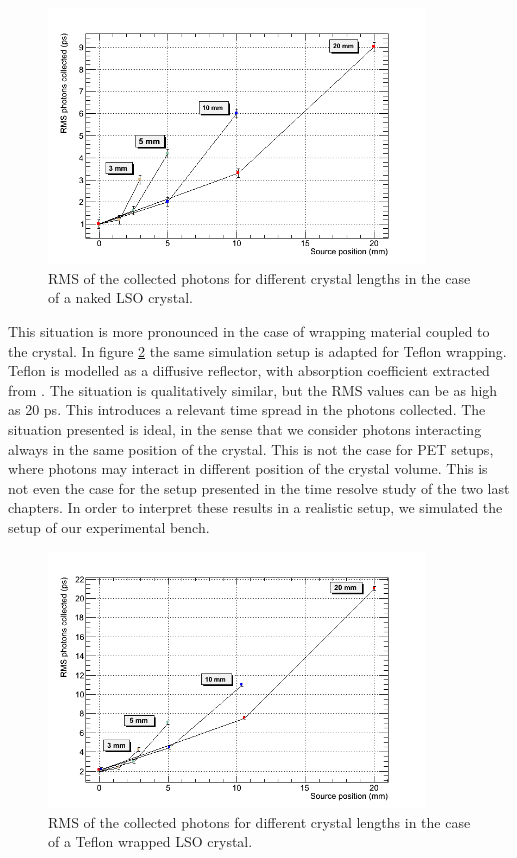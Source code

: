 \begin{figure}[htbp]
\begin{center}
\includegraphics[width=10cm]{../Pictures/Chapter_6/rms_moving.png}
\end{center}
\caption[RMS photons for naked LSO]{RMS of the collected photons for different crystal lengths in the case of a naked LSO crystal.}
\label{fig:rms_moving}
\end{figure}

This situation is more pronounced in the case of wrapping material coupled to the crystal. In figure \ref{fig:rms_moving_wrap} the same simulation setup is adapted for Teflon wrapping. Teflon is modelled as a diffusive reflector, with absorption coefficient extracted from \cite{Kawamura1996}. The situation is qualitatively similar, but the RMS values can be as high as 20 ps. This introduces a relevant time spread in the photons collected.
The situation presented is ideal, in the sense that we consider photons interacting always in the same position of the crystal. This is not the case for PET setups, where photons may interact in different position of the crystal volume. This is not even the case for the setup presented in the time resolve study of the two last chapters. In order to interpret these results in a realistic setup, we simulated the setup of our experimental bench.

\begin{figure}[htbp]
\begin{center}
\includegraphics[width=10cm]{../Pictures/Chapter_6/rms_moving_wrap.png}
\end{center}
\caption[RMS photons for Teflon wrapped LSO]{RMS of the collected photons for different crystal lengths in the case of a Teflon wrapped LSO crystal.}
\label{fig:rms_moving_wrap}
\end{figure}

